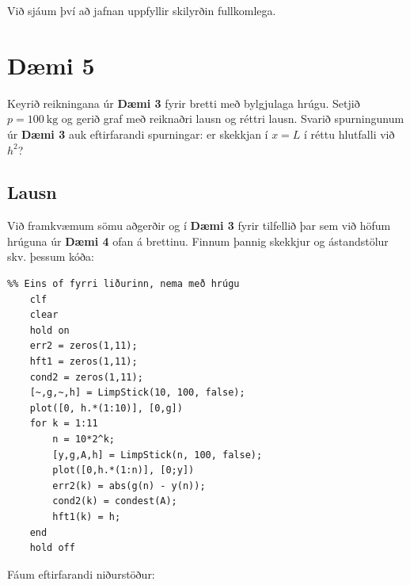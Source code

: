 \documentclass[11pt]{article}
\begin{document}
{Við sjáum því að jafnan uppfyllir skilyrðin fullkomlega.

\newpage
\section*{Dæmi 5}

Keyrið reikningana úr \textbf{Dæmi 3} fyrir bretti með bylgjulaga hrúgu. Setjið $p =\SI{100}{\kilo\gram}$ og gerið graf með reiknaðri lausn og réttri lausn. Svarið spurningunum úr \textbf{Dæmi 3} auk eftirfarandi spurningar: er skekkjan í $x = L$ í réttu hlutfalli við $h^2$?

\subsection*{Lausn}

Við framkvæmum sömu aðgerðir og í \textbf{Dæmi 3} fyrir tilfellið þar sem við höfum hrúguna úr \textbf{Dæmi 4} ofan á brettinu. Finnum þannig skekkjur og ástandstölur skv. þessum kóða:
\begin{verbatim}
%% Eins of fyrri liðurinn, nema með hrúgu
    clf
    clear
    hold on
    err2 = zeros(1,11);
    hft1 = zeros(1,11);
    cond2 = zeros(1,11);
    [~,g,~,h] = LimpStick(10, 100, false);
    plot([0, h.*(1:10)], [0,g])
    for k = 1:11
        n = 10*2^k;
        [y,g,A,h] = LimpStick(n, 100, false);
        plot([0,h.*(1:n)], [0;y])
        err2(k) = abs(g(n) - y(n));
        cond2(k) = condest(A);
        hft1(k) = h;
    end
    hold off
\end{verbatim}

Fáum eftirfarandi niðurstöður:

}
\end{document}
